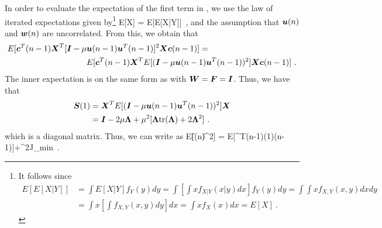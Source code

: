 In order to evaluate the expectation of the first term in , we use the law of iterated expectations given by\footnote{It follows since
\begin{align*}
  E[E[X|Y]] &= \int E[X|Y]f_Y(y)dy = \int \left[\int x f_{X|Y}(x|y)dx\right]f_Y(y)dy = \int\int x f_{X,Y}(x,y)dxdy\\
  &= \int x \left[\int f_{X,Y}(x,y)dy\right]dx = \int x f_X(x)dx = E[X]\ .
\end{align*}}
\bmath
  E[X] = E[E[X|Y]]\ ,
\emath
and the assumption that $\boldsymbol{u}(n)$ and $\boldsymbol{w}(n)$ are uncorrelated. From this, we obtain that
\begin{align}
   E[\boldsymbol{c}^T(n-1)\boldsymbol{X}^T[\boldsymbol{I}-\mu &\boldsymbol{u}(n-1)\boldsymbol{u}^T(n-1)]^2\boldsymbol{X}\boldsymbol{c}(n-1)] = \notag\\
   &E[\boldsymbol{c}^T(n-1)\boldsymbol{X}^TE[(\boldsymbol{I}-\mu \boldsymbol{u}(n-1)\boldsymbol{u}^T(n-1))^2]\boldsymbol{X}\boldsymbol{c}(n-1)]\ .
\end{align}
The inner expectation is on the same form as  with $\boldsymbol{W}=\boldsymbol{F}=\boldsymbol{I}$. Thus, we have that
\begin{align}
  \vect{S}(1) &= \vect{X}^TE[(\vect{I}-\mu \vect{u}(n-1)\vect{u}^T(n-1))^2]\vect{X}\\
  &= \vect{I}-2\mu\vect{\Lambda}+\mu^2[\vect{\Lambda}\tr{\vect{\Lambda}}+2\vect{\Lambda}^2]\ .
\end{align}
which is a diagonal matrix. Thus, we can write  as
\bmath
  E[\|(n)\|^2] = E[^T(n-1)(1)(n-1)]+\mu^2J_\textup{min}\tr{\vect{\Lambda}}\ .
  \label{eq:app_lms_first_recur}
\emath

